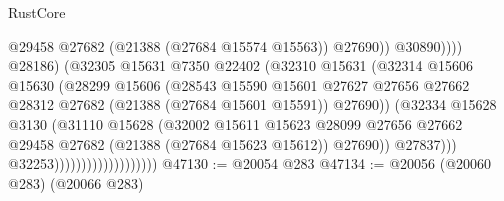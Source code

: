 \begin{lexlean}{RustCore}
\begin{coremodule}
                                                      @29458
                                                      @27682
                                                      (@21388 (@27684 @15574 @15563))
                                                      @27690))
                                                  @30890))))
                                          @28186)
                                        (@32305
                                          @15631
                                          @7350
                                          @22402
                                          (@32310
                                            @15631
                                            (@32314
                                              @15606
                                              @15630
                                              (@28299
                                                @15606
                                                (@28543
                                                  @15590
                                                  @15601
                                                  @27627
                                                  @27656
                                                  @27662
                                                  @28312
                                                  @27682
                                                  (@21388 (@27684 @15601 @15591))
                                                  @27690))
                                              (@32334
                                                @15628
                                                @3130
                                                (@31110
                                                  @15628
                                                  (@32002
                                                    @15611
                                                    @15623
                                                    @28099
                                                    @27656
                                                    @27662
                                                    @29458
                                                    @27682
                                                    (@21388 (@27684 @15623 @15612))
                                                    @27690))
                                                @27837)))
                                          @32253)))))))))))))))))))
@47130 := @20054 @283
@47134 := @20056 (@20060 @283) (@20066 @283)

\end{coremodule}
\end{lexlean}
